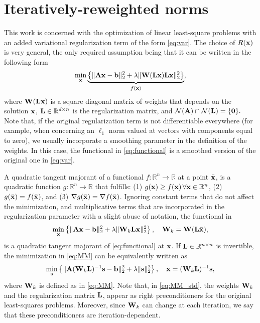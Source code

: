 \documentclass[11pt]{article}
\numberwithin{equation}{section}
\newcommand{\bfA}{{\bf A}}
\newcommand{\bfL}{{\bf L}}
\newcommand{\bfW}{{\bf W}}
\newcommand{\bfb}{{\bf b}}
\newcommand{\bfs}{{\bf s}}
\newcommand{\bfx}{{\bf x}}
\begin{document}
\section{Iteratively-reweighted norms}\label{sec2}
This work is concerned with the optimization of linear least-square problems with an added variational regularization term of the form \eqref{eq:var}. The choice of $R(\bfx)$ is very general, the only required assumption being that it can be written in the following form
\begin{equation}\label{eq:functional}
\displaystyle \min_\bfx \underbrace{\left\{\| \bfA \bfx - \bfb \|_2^2 + \lambda \|\bfW(\bfL \bfx) \bfL \bfx \|_2^2\right\}}_{f(\bfx)},
\end{equation}
where $\bfW(\bfL \bfx)$ is a square diagonal matrix of weights that depends on the solution $\bfx$, $\bfL\in \mathbb{R}^{d\times n}$ is the regularization matrix, and $\mathcal{N}(\bfA) \cap \mathcal{N}(\bfL) = \{\bf0\}.$ Note that, if the original regularization term is not differentiable everywhere (for example, when concerning an $\ell_1$ norm valued at vectors with components equal to zero), we usually incorporate a smoothing parameter in the definition of the weights. In this case, the functional in \eqref{eq:functional} is a smoothed version of the original one in \eqref{eq:var}.

A quadratic tangent majorant of a functional $f:\mathbb{R}^n\rightarrow\mathbb{R}$ at a point $\bar\bfx$, is a quadratic function $g:\mathbb{R}^n\rightarrow\mathbb{R}$ that fulfills: (1) $g(\bfx)\geq f(\bfx) \,\forall \bfx \in \mathbb{R}^n$, (2) $g(\bar\bfx) = f(\bar\bfx)$, and (3) $\nabla g(\bar\bfx) = \nabla f(\bar\bfx)$. Ignoring constant terms that do not affect the minimization, and multiplicative terms that are incorporated in the regularization parameter with a slight abuse of notation, the functional in 
\begin{equation}\label{eq:MM}
   \min_\bfx \left\{\| \bfA \bfx - \bfb \|_2^2 + \lambda \|\bfW_k \bfL \bfx \|_2^2\right\}, \quad \bfW_k =\bfW(\bfL \bar\bfx),
\end{equation}
is a quadratic tangent majorant of \eqref{eq:functional} at $\bar \bfx$. If $\bfL \in \mathbb{R}^{n \times n}$ is invertible, the minimization in \eqref{eq:MM} can be equivalently written as 
\begin{equation}\label{eq:MM_std}
   \min_\bfs \left\{\| \bfA (\bfW_k \bfL)^{-1} \bfs - \bfb \|_2^2 + \lambda \| \bfs \|_2^2\right\}, \quad \bfx = (\bfW_k \bfL)^{-1} \bfs,
\end{equation}
where $\bfW_k$ is defined as in \eqref{eq:MM}. Note that, in \eqref{eq:MM_std}, the weights $\bfW_k$ and the regularization matrix $\bfL$, appear as right preconditioners for the original least-squares problems. Moreover, since $\bfW_k$ can change at each iteration, we say that these preconditioners are iteration-dependent. 
\end{document}
